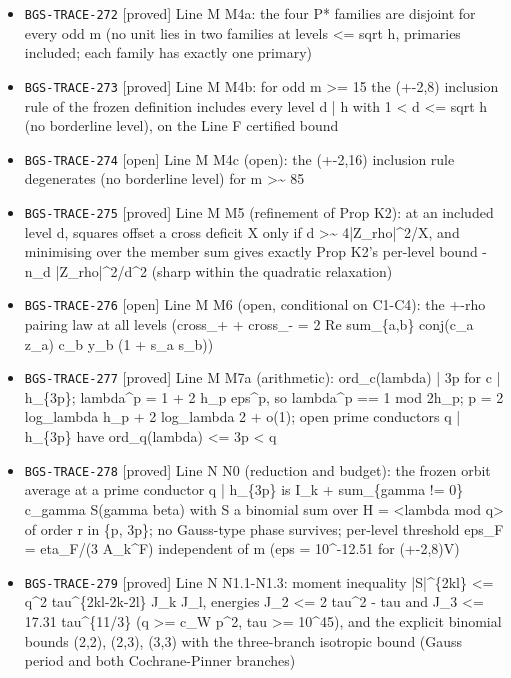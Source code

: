 \begin{itemize}
  \item \texttt{BGS-TRACE-272} [proved] Line M M4a: the four P* families are disjoint for every odd m (no unit lies in two families at levels <= sqrt h, primaries included; each family has exactly one primary)
  \item \texttt{BGS-TRACE-273} [proved] Line M M4b: for odd m >= 15 the (+-2,8) inclusion rule of the frozen definition includes every level d | h with 1 < d <= sqrt h (no borderline level), on the Line F certified bound
  \item \texttt{BGS-TRACE-274} [open] Line M M4c (open): the (+-2,16) inclusion rule degenerates (no borderline level) for m >\textasciitilde{} 85
  \item \texttt{BGS-TRACE-275} [proved] Line M M5 (refinement of Prop K2): at an included level d, squares offset a cross deficit X only if d >\textasciitilde{} 4|Z\_rho|\textasciicircum{}2/X, and minimising over the member sum gives exactly Prop K2's per-level bound -n\_d |Z\_rho|\textasciicircum{}2/d\textasciicircum{}2 (sharp within the quadratic relaxation)
  \item \texttt{BGS-TRACE-276} [open] Line M M6 (open, conditional on C1-C4): the +-rho pairing law at all levels (cross\_+ + cross\_- = 2 Re sum\_\{a,b\} conj(c\_a z\_a) c\_b y\_b (1 + s\_a s\_b))
  \item \texttt{BGS-TRACE-277} [proved] Line M M7a (arithmetic): ord\_c(lambda) | 3p for c | h\_\{3p\}; lambda\textasciicircum{}p = 1 + 2 h\_p eps\textasciicircum{}p, so lambda\textasciicircum{}p == 1 mod 2h\_p; p = 2 log\_lambda h\_p + 2 log\_lambda 2 + o(1); open prime conductors q | h\_\{3p\} have ord\_q(lambda) <= 3p < q
  \item \texttt{BGS-TRACE-278} [proved] Line N N0 (reduction and budget): the frozen orbit average at a prime conductor q | h\_\{3p\} is I\_k + sum\_\{gamma != 0\} c\_gamma S(gamma beta) with S a binomial sum over H = <lambda mod q> of order r in \{p, 3p\}; no Gauss-type phase survives; per-level threshold eps\_F = eta\_F/(3 A\_k\textasciicircum{}F) independent of m (eps = 10\textasciicircum{}-12.51 for (+-2,8)V)
  \item \texttt{BGS-TRACE-279} [proved] Line N N1.1-N1.3: moment inequality |S|\textasciicircum{}\{2kl\} <= q\textasciicircum{}2 tau\textasciicircum{}\{2kl-2k-2l\} J\_k J\_l, energies J\_2 <= 2 tau\textasciicircum{}2 - tau and J\_3 <= 17.31 tau\textasciicircum{}\{11/3\} (q >= c\_W p\textasciicircum{}2, tau >= 10\textasciicircum{}45), and the explicit binomial bounds (2,2), (2,3), (3,3) with the three-branch isotropic bound (Gauss period and both Cochrane-Pinner branches)

\end{itemize}
